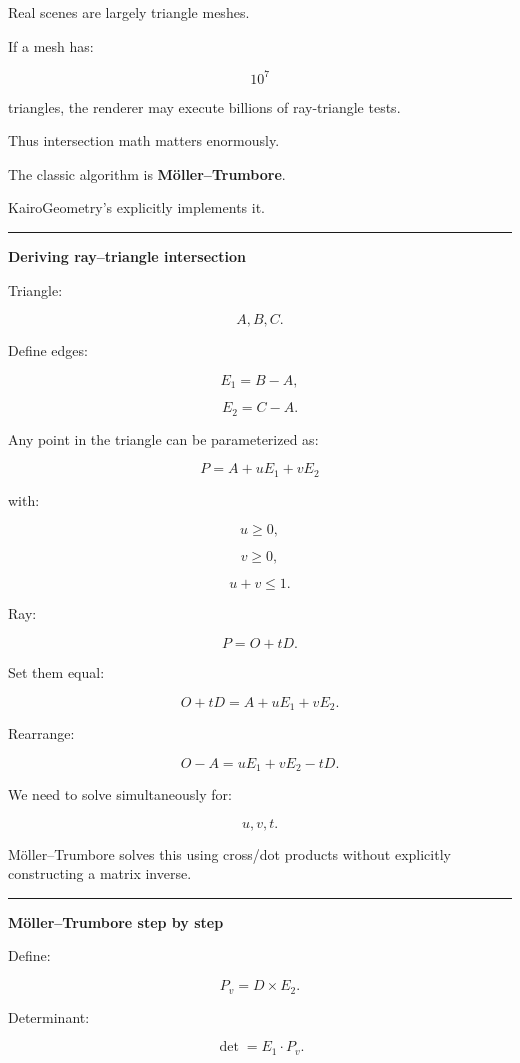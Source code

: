 Real scenes are largely triangle meshes.

If a mesh has:

\[
10^7
\]

triangles, the renderer may execute billions of ray-triangle tests.

Thus intersection math matters enormously.

The classic algorithm is \textbf{Möller--Trumbore}.

KairoGeometry's  explicitly implements it.

\begin{center}\rule{0.5\linewidth}{0.5pt}\end{center}

\textbf{Deriving ray--triangle intersection}

Triangle:

\[
A,B,C.
\]

Define edges:

\[
E_1=B-A,
\]

\[
E_2=C-A.
\]

Any point in the triangle can be parameterized as:

\[
P=A+uE_1+vE_2
\]

with:

\[
u\ge0,
\]

\[
v\ge0,
\]

\[
u+v\le1.
\]

Ray:

\[
P=O+tD.
\]

Set them equal:

\[
O+tD
=
A+uE_1+vE_2.
\]

Rearrange:

\[
O-A
=
uE_1+vE_2-tD.
\]

We need to solve simultaneously for:

\[
u,v,t.
\]

Möller--Trumbore solves this using cross/dot products without explicitly constructing a matrix inverse.

\begin{center}\rule{0.5\linewidth}{0.5pt}\end{center}

\textbf{Möller--Trumbore step by step}

Define:

\[
P_v=D\times E_2.
\]

Determinant:

\[
\boxed{
\det=
E_1\cdot P_v.
}
\]

